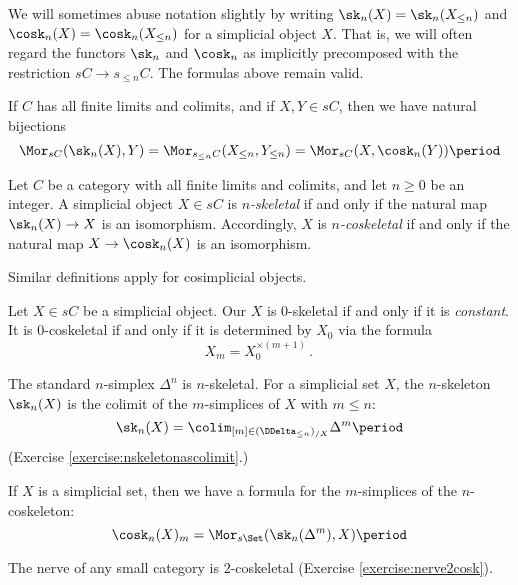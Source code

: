 We will sometimes abuse notation slightly by writing $\sk_n(X) = \sk_n(X_{\leq n})$ and $\cosk_n(X) = \cosk_n(X_{\leq n})$ for a simplicial object $X$.
That is, we will often regard the functors $\sk_n$ and $\cosk_n$ as implicitly precomposed with the restriction $sC \to s_{\leq n}C$.
The formulas above remain valid.

If $C$ has all finite limits and colimits, and if $X,Y \in sC$, then we have natural bijections
\[
  \Mor_{sC}(\sk_n(X), Y) = \Mor_{s_{\leq n}C}(X_{\leq n}, Y_{\leq n}) = \Mor_{sC}(X, \cosk_n(Y)) \period
\]

\begin{definition}
  Let $C$ be a category with all finite limits and colimits, and let $n \geq 0$ be an integer.
  A simplicial object $X \in sC$ is \emph{$n$-skeletal} if and only if the natural map $\sk_n(X) \to X$ is an isomorphism.
  Accordingly, $X$ is \emph{$n$-coskeletal} if and only if the natural map $X \to \cosk_n(X)$ is an isomorphism.

  Similar definitions apply for cosimplicial objects.
\end{definition}

\begin{eg}
  Let $X \in sC$ be a simplicial object.
  Our $X$ is $0$-skeletal if and only if it is \emph{constant}.
  It is $0$-coskeletal if and only if it is determined by $X_0$ via the formula
  \[
    X_m = X_0^{\times(m+1)} \period
  \]
\end{eg}

\begin{eg}
  The standard $n$-simplex $\Delta^n$ is $n$-skeletal.
  For a simplicial set $X$, the $n$-skeleton $\sk_n(X)$ is the colimit of the $m$-simplices of $X$ with $m \leq n$:
  \[
    \sk_n(X) = \colim_{[m] \in (\DDelta_{\leq n})_{/X}} \Delta^m \period
  \]
  (Exercise \ref{exercise:nskeletonascolimit}.)
\end{eg}

\begin{eg}
  If $X$ is a simplicial set, then we have a formula for the $m$-simplices of the $n$-coskeleton:
  \[
    \cosk_n(X)_m = \Mor_{s\Set}(\sk_n(\Delta^m), X) \period
  \]
\end{eg}

\begin{eg}
  The nerve of any small category is $2$-coskeletal (Exercise \ref{exercise:nerve2cosk}).
\end{eg}


